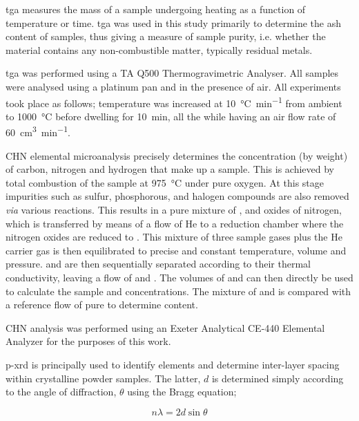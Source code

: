 \acrfull{tga} measures the mass of a sample undergoing heating as a function of temperature or time.\citep{coats1963thermogravimetric} \acrshort{tga} was used in this study primarily to determine the \gls{ash content} of samples, thus giving a measure of sample purity,\citep{mcnaught1997compendium} i.e. whether the material contains any non-combustible matter, typically residual metals.

\acrshort{tga} was performed using a TA Q500 Thermogravimetric Analyser. All samples were analysed using a platinum pan and in the presence of air. All experiments took place as follows; temperature was increased at \qty{10}{\degreeCelsius\per\minute} from ambient to \qty{1000}{\degreeCelsius} before dwelling for \qty{10}{\minute}, all the while having an air flow rate of \qty{60}{\cm\cubed\per\minute}.

CHN elemental microanalysis precisely determines the concentration (by weight) of carbon, nitrogen and hydrogen that make up a sample. This is achieved by total combustion of the sample at \qty{975}{\degreeCelsius} under pure oxygen. At this stage impurities such as sulfur, phosphorous, and halogen compounds are also removed \textit{via} various reactions. This results in a pure mixture of ,  and oxides of nitrogen, which is transferred by means of a flow of He to a reduction chamber where the nitrogen oxides are reduced to . This mixture of three sample gases plus the He carrier gas is then equilibrated to precise and constant temperature, volume and pressure.  and  are then sequentially separated according to their thermal conductivity, leaving a flow of  and . The volumes of  and  can then directly be used to calculate the sample  and  concentrations. The mixture of  and  is compared with a reference flow of pure  to determine  content.

CHN analysis was performed using an Exeter Analytical CE-440 Elemental Analyzer for the purposes of this work.

\acrfull{p-xrd} is principally used to identify elements and determine inter-layer spacing within crystalline powder samples. The latter, $d$ is determined simply according to the angle of diffraction, $\theta$ using the Bragg equation;

\begin{equation}
    n\lambda = 2 d \sin{\theta}
\end{equation}

